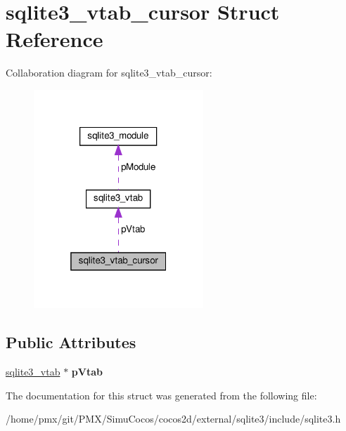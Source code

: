 \hypertarget{structsqlite3__vtab__cursor}{}\section{sqlite3\+\_\+vtab\+\_\+cursor Struct Reference}
\label{structsqlite3__vtab__cursor}


Collaboration diagram for sqlite3\+\_\+vtab\+\_\+cursor\+:
\nopagebreak
\begin{figure}[H]
\begin{center}
\leavevmode
\includegraphics[width=181pt]{structsqlite3__vtab__cursor__coll__graph}
\end{center}
\end{figure}
\subsection*{Public Attributes}
\begin{DoxyCompactItemize}
\item 
\mbox{\label{structsqlite3__vtab__cursor_a7bb57f3f9c7c618a9d6d33c6d9820bdc}} 
\hyperlink{structsqlite3__vtab}{sqlite3\+\_\+vtab} $\ast$ {\bfseries p\+Vtab}
\end{DoxyCompactItemize}


The documentation for this struct was generated from the following file\+:\begin{DoxyCompactItemize}
\item 
/home/pmx/git/\+P\+M\+X/\+Simu\+Cocos/cocos2d/external/sqlite3/include/sqlite3.\+h\end{DoxyCompactItemize}
